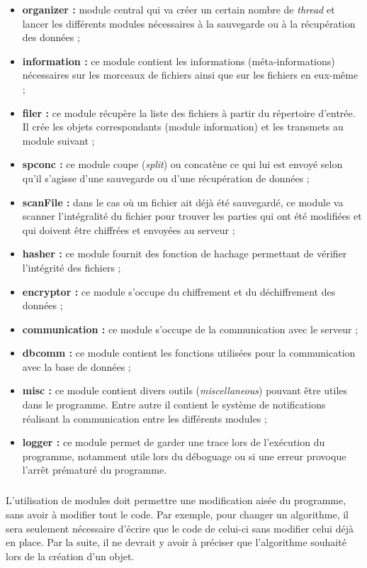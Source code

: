 \documentclass[a4paper,10pt, twoside]{report}
\begin{document}
\begin{spacing}{1.2}
\begin{itemize}
  \item \textbf{organizer :} module central qui va créer un certain nombre de
  \textit{thread} et lancer les différents modules nécessaires à la
  sauvegarde ou à la récupération des données ;
  \item \textbf{information :} ce module contient les informations
  (méta-informations) nécessaires sur les morceaux de fichiers ainsi que
  sur les fichiers en eux-même ;
  \item \textbf{filer :} ce module récupère la liste des fichiers à
  partir du répertoire d'entrée. Il crée les objets correspondants
  (module information) et les transmets au module suivant ;
  \item \textbf{spconc :} ce module coupe (\textit{split}) ou concatène ce
  qui lui est envoyé selon qu'il s'agisse d'une sauvegarde ou d'une
  récupération de données ;
  \item \textbf{scanFile :} dans le cas où un fichier ait déjà été
  sauvegardé, ce module va scanner l'intégralité du fichier pour trouver
  les parties qui ont été modifiées et qui doivent être chiffrées et
  envoyées au serveur ;
  \item \textbf{hasher :} ce module fournit des fonction de hachage permettant
  de vérifier l'intégrité des fichiers ;
  \item \textbf{encryptor :} ce module s'occupe du chiffrement et du
  déchiffrement des données ;
  \item \textbf{communication :} ce module s'occupe de la communication avec
  le serveur ;
  \item \textbf{dbcomm :} ce module contient les fonctions utilisées pour la
  communication avec la base de données ;
  \item \textbf{misc :} ce module contient divers outils
  (\textit{miscellaneous}) pouvant être utiles dans le programme. Entre autre
  il contient le système de notifications réalisant la communication entre
  les différents modules ;
  \item \textbf{logger :} ce module permet de garder une trace lors de
  l'exécution du programme, notamment utile lors du déboguage ou si une
  erreur provoque l'arrêt prématuré du programme.
\end{itemize}

\subparagraph{}
L'utilisation de modules doit permettre une modification aisée du programme,
sans avoir à modifier tout le code. Par exemple, pour changer un algorithme,
il sera seulement nécessaire d'écrire que le code de celui-ci sans
modifier celui déjà en place. Par la suite, il ne devrait y avoir à
préciser que l'algorithme souhaité lors de la création d'un objet.


\end{spacing}
\end{document}
